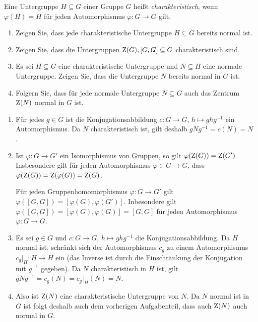 \begin{question}[subtitle = Charakteristische Untergruppen]
  Eine Untergruppe $H \subseteq G$ einer Gruppe $G$ heißt \emph{charakteristisch}, wenn $\varphi(H) = H$ für jeden Automorphismus $\varphi \colon G \to G$ gilt.
  \begin{enumerate}
    \item
      Zeigen Sie, dass jede charakteristische Untergruppe $H \subseteq G$ bereits normal ist.
    \item
      Zeigen Sie, dass die Untergruppen $\operatorname{Z}(G), [G,G] \subseteq G$ charakteristisch sind.
    \item
      Es sei $H \subseteq G$ eine charakteristische Untergruppe und $N \subseteq H$ eine normale Untergruppe.
      Zeigen Sie, dass die Untergruppe $N$ bereits normal in $G$ ist.
    \item
      Folgern Sie, dass für jede normale Untergruppe $N \subseteq G$ auch das Zentrum $\operatorname{Z}(N)$ normal in $G$ ist.
  \end{enumerate}
\end{question}


\begin{solution}
  \begin{enumerate}
    \item
      Für jedes $g \in G$ ist die Konjugationsabbildung $c \colon G \to G$, $h \mapsto ghg^{-1}$ ein Automorphismus.
      Da $N$ charakteristisch ist, gilt deshalb $gNg^{-1} = c(N) = N$.
    \item
      Ist $\varphi \colon G \to G'$ ein Isomorphismus von Gruppen, so gilt $\varphi(\operatorname{Z}(G)) = \operatorname{Z}(G')$.
      Insbesondere gilt für jeden Automorphismus $\varphi \in G \to G$, dass $\varphi(\operatorname{Z}(G)) = \operatorname{Z}(\varphi(G)) = \operatorname{Z}(G)$.
      
      Für jeden Gruppenhomomorphismus $\varphi \colon G \to G'$ gilt $\varphi([G,G]) = [\varphi(G), \varphi(G')]$.
      Inbesondere gilt $\varphi([G,G]) = [\varphi(G), \varphi(G)] = [G,G]$ für jeden Automorphismus $\varphi \colon G \to G$.
    \item
      Es sei $g \in G$ und $c \colon G \to G$, $h \mapsto ghg^{-1}$ die Konjugationsabbildung.
      Da $H$ normal ist, schränkt sich der Automorphismus $c_g$ zu einem Automorphismus $c_g|_H \colon H \to H$ ein (das Inverse ist durch die Einschränkung der Konjugation mit $g^{-1}$ gegeben).
      Da $N$ charakteristisch in $H$ ist, gilt $g N g^{-1} = c_g(N) = c_g|_H(N) = N$.
    \item
      
      Also ist $\operatorname{Z}(N)$ eine charakteristische Untergruppe von $N$.
      Da $N$ normal ist in $G$ ist folgt deshalb auch dem vorherigen Aufgabenteil, dass auch $\operatorname{Z}(N)$ auch normal in $G$.
  \end{enumerate}
\end{solution}


